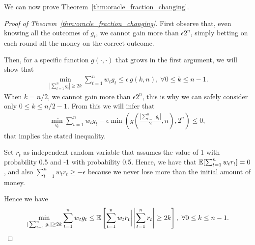 We can now prove Theorem~\ref{thm:oracle_fraction_changing}.

\begin{proof}[Proof of Theorem~\ref{thm:oracle_fraction_changing}]
First observe that, even knowing all the outcomes of $g_t$, we cannot gain more than $\epsilon 2^n$, simply betting on each round all the money on the correct outcome.

Then, for a specific function $g(\cdot,\cdot)$ that grows in the first argument, we will show that
\begin{align*}
\min_{|\sum_{t=1}^n g_t| \geq 2 k} \sum_{t=1}^n w_t g_t 
\leq \epsilon \, g(k,n), \ \forall 0 \leq k \leq n-1.
\end{align*}
When $k=n/2$, we cannot gain more than $\epsilon 2^n$, this is why we can safely consider only $0\leq k\leq n/2-1$.
From this we will infer that
\begin{align*}
\min_{g_t} \sum_{t=1}^n w_t g_t - \epsilon\min\left(g\left(\frac{|\sum_{t=1}^n g_t|}{2},n\right),2^n\right) \leq 0,
\end{align*}
that implies the stated inequality.

Set $r_t$ as independent random variable that assumes the value of 1 with probability 0.5 and -1 with probability 0.5.
Hence, we have that $\mathbb{E}[ \sum_{t=1}^n w_t r_t ]=0$, and also $\sum_{t=1}^n w_t r_t \geq -\epsilon$ because we never lose more than the initial amount of money.

Hence we have
\begin{align*}
\min_{|\sum_{t=1}^n g_t| \geq 2 k} \sum_{t=1}^n w_t g_t 
\leq \mathbb{E}\left[\sum_{t=1}^n w_t r_t \bigg| \left|\sum_{t=1}^n r_t\right| \geq 2 k\right], \ \forall 0 \leq k \leq n-1.
\end{align*}


\end{proof}
